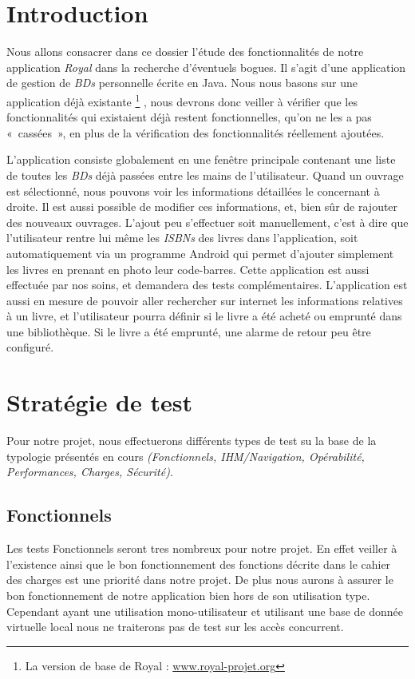 \documentclass[]{../support-iutrs} %
\begin{document}
	
\header

\section {Introduction}
Nous allons consacrer dans ce dossier l'étude des fonctionnalités de notre application \emph{Royal} dans la recherche d'éventuels bogues. 
Il s'agit d'une application de gestion de \emph{BDs} personnelle écrite en Java. 
Nous nous basons sur une application déjà existante
\footnote{La version de base de Royal : \url{www.royal-projet.org}}
, nous devrons donc veiller à vérifier que les fonctionnalités qui existaient déjà restent fonctionnelles, qu'on ne les a pas «~cassées~», en plus de la vérification des fonctionnalités réellement ajoutées. 

L'application consiste globalement en une fenêtre principale contenant une liste de toutes les \emph{BDs} déjà passées entre les mains de l'utilisateur. 
Quand un ouvrage est sélectionné, nous pouvons voir les informations détaillées le concernant à droite. 
Il est aussi possible de modifier ces informations, et, bien sûr de rajouter des nouveaux ouvrages. 
L'ajout peu s'effectuer soit manuellement, c'est à dire que l'utilisateur rentre lui même les \emph{ISBNs} des livres dans l'application, soit automatiquement via un programme Android qui permet d'ajouter simplement les livres en prenant en photo leur code-barres. 
Cette application est aussi effectuée par nos soins, et demandera des tests complémentaires. 
L'application est aussi en mesure de pouvoir aller rechercher sur internet les informations relatives à un livre,
et l'utilisateur pourra définir si le livre a été acheté ou emprunté dans une bibliothèque.
Si le livre a été emprunté, une alarme de retour peu être configuré. 

\section{Stratégie de test}

Pour notre projet, nous effectuerons différents types de test su la base de la typologie présentés en cours \textit{(Fonctionnels, IHM/Navigation, Opérabilité, Performances, Charges, Sécurité)}.

\subsection{Fonctionnels}
Les tests Fonctionnels seront tres nombreux pour notre projet. 
En effet veiller à l’existence ainsi que le bon fonctionnement des fonctions décrite dans le cahier des charges est une priorité dans notre projet.
De plus nous aurons à assurer le bon fonctionnement de notre application bien hors de son utilisation type.
Cependant ayant une utilisation mono-utilisateur et utilisant une base de donnée virtuelle local nous ne traiterons pas de test sur les accès concurrent.
\end{document}

